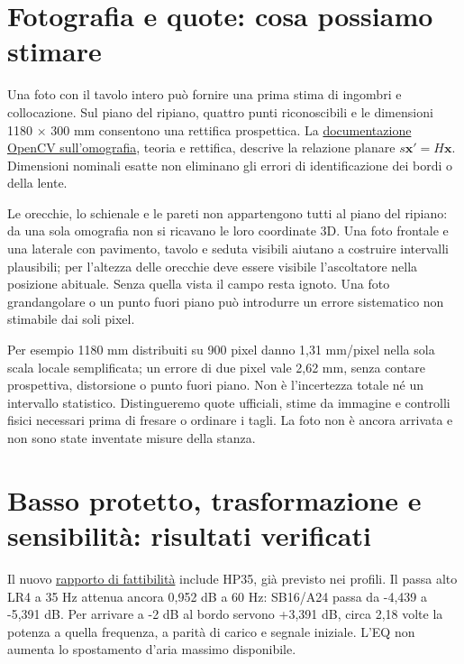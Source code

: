 \documentclass[
  italian,
  11pt,
  a4paper,
]{article}
\begin{document}
\section{Fotografia e quote: cosa possiamo
stimare}\label{fotografia-e-quote-cosa-possiamo-stimare}

Una foto con il tavolo intero può fornire una prima stima di ingombri e collocazione. Sul
piano del ripiano, quattro punti riconoscibili e le dimensioni 1180 × 300 mm consentono una
rettifica prospettica. La
\href{https://docs.opencv.org/4.13.0/d9/dab/tutorial_homography.html}{documentazione OpenCV
sull'omografia}, teoria e rettifica, descrive la relazione planare
\(s\mathbf{x}'=H\mathbf{x}\). Dimensioni nominali esatte non eliminano gli errori di
identificazione dei bordi o della lente.

Le orecchie, lo schienale e le pareti non appartengono tutti al piano del ripiano: da una
sola omografia non si ricavano le loro coordinate 3D. Una foto frontale e una laterale con
pavimento, tavolo e seduta visibili aiutano a costruire intervalli plausibili; per l'altezza
delle orecchie deve essere visibile l'ascoltatore nella posizione abituale. Senza quella
vista il campo resta ignoto. Una foto grandangolare o un punto fuori piano può introdurre un
errore sistematico non stimabile dai soli pixel.

Per esempio 1180 mm distribuiti su 900 pixel danno 1,31 mm/pixel nella sola scala locale
semplificata; un errore di due pixel vale 2,62 mm, senza contare prospettiva, distorsione o
punto fuori piano. Non è l'incertezza totale né un intervallo statistico. Distingueremo
quote ufficiali, stime da immagine e controlli fisici necessari prima di fresare o ordinare
i tagli. La foto non è ancora arrivata e non sono state inventate misure della stanza.

\section{Basso protetto, trasformazione e sensibilità: risultati
verificati}\label{basso-protetto-trasformazione-e-sensibilituxe0-risultati-verificati}

Il nuovo
\href{../../research-vault/sistema-autonomo-20261120/fattibilita-basso.json}{rapporto di
fattibilità} include HP35, già previsto nei profili. Il passa alto LR4 a 35 Hz attenua
ancora 0,952 dB a 60 Hz: SB16/A24 passa da -4,439 a -5,391 dB. Per arrivare a -2 dB al bordo
servono +3,391 dB, circa 2,18 volte la potenza a quella frequenza, a parità di carico e
segnale iniziale. L'EQ non aumenta lo spostamento d'aria massimo disponibile.
\end{document}
